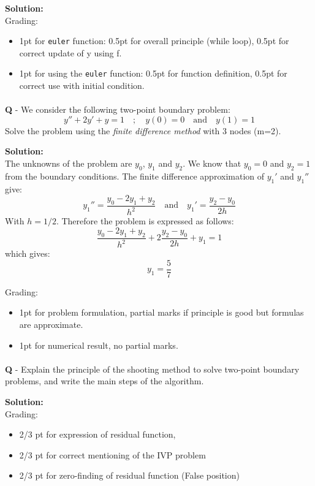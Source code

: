 \documentclass{llncs}
\newcounter{ques}
\renewcommand{\question}[1]{\paragraph{}\textbf{Q\theques} - #1\stepcounter{ques} }
\newcommand{\answer}[1]{\color{red}\textbf{Solution:}\\#1\color{black}}
\begin{document}
\answer{
\color{red} Grading:
\begin{itemize}
\item 1pt for \texttt{euler} function: 0.5pt for overall principle (while loop), 0.5pt for correct update of y using f.
\item 1pt for using the \texttt{euler} function: 0.5pt for function definition, 0.5pt for correct use with initial condition.
\end{itemize}
}
\newpage

\question{We consider the following two-point boundary problem:
$$
y''+2y'+y=1 \quad ; \quad y(0)=0  \quad \mathrm{and} \quad y(1)=1
$$
Solve the problem using the \emph{finite difference method} with 3 nodes (m=2). 
}

\answer{The unknowns of the problem are $y_0$, $y_1$ and $y_2$. We know that $y_0=0$ and $y_2=1$ from the boundary conditions. The finite difference approximation
of $y_1'$ and $y_1''$ give:
$$
y_1''=\frac{y_0-2y_1+y_2}{h^2} \quad \mathrm{and} \quad y_1' = \frac{y_2-y_0}{2h}
$$
With $h=1/2$.
Therefore the problem is expressed as follows:
$$
\frac{y_0-2y_1+y_2}{h^2} + 2\frac{y_2-y_0}{2h}+y_1=1
$$
which gives:
$$
y_1 = \frac{5}{7}
$$

Grading:
\begin{itemize}
\item 1pt for problem formulation, partial marks if principle is good but formulas are approximate.
\item 1pt for numerical result, no partial marks.
\end{itemize}
}

\newpage
\question{Explain the principle of the shooting method to solve 
two-point boundary problems, and write the main steps of the 
algorithm.}

\answer{
Grading:
\begin{itemize}
\item 2/3 pt for expression of residual function,
\item 2/3 pt for correct mentioning of the IVP problem
\item 2/3 pt for zero-finding of residual function (False position)
\end{itemize}
}


\newpage
\appendix
\end{document}
